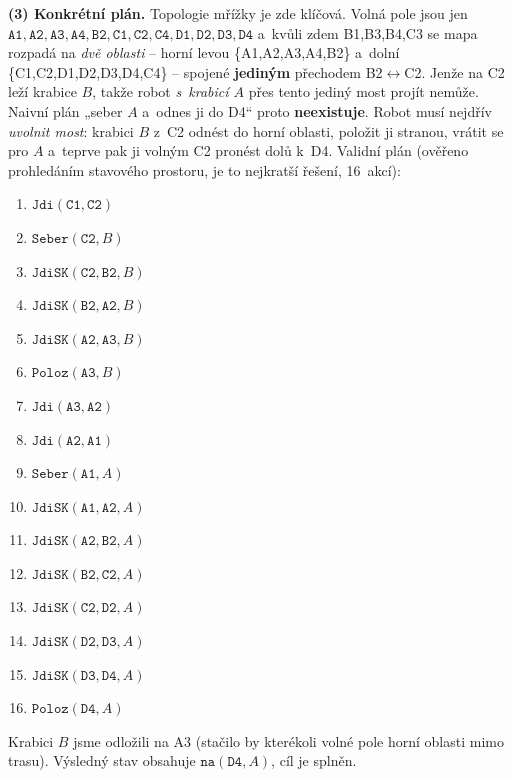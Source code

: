 \begin{priklad}
\medskip
\textbf{(3) Konkrétní plán.} Topologie mřížky je zde klíčová. Volná pole jsou jen $\mathtt{A1,A2,A3,A4,B2,C1,C2,C4,D1,D2,D3,D4}$ a~kvůli zdem B1,B3,B4,C3 se mapa rozpadá na \emph{dvě oblasti} -- horní levou \{A1,A2,A3,A4,B2\} a~dolní \{C1,C2,D1,D2,D3,D4,C4\} -- spojené \textbf{jediným} přechodem B2$\leftrightarrow$C2. Jenže na C2 leží krabice $B$, takže robot \emph{s~krabicí $A$} přes tento jediný most projít nemůže. Naivní plán „seber $A$ a~odnes ji do D4`` proto \textbf{neexistuje}. Robot musí nejdřív \emph{uvolnit most}: krabici $B$ z~C2 odnést do horní oblasti, položit ji stranou, vrátit se pro $A$ a~teprve pak ji volným C2 pronést dolů k~D4. Validní plán (ověřeno prohledáním stavového prostoru, je to nejkratší řešení, 16~akcí):
\begin{enumerate}[nosep]
  \item $\mathtt{Jdi}(\mathtt{C1},\mathtt{C2})$
  \item $\mathtt{Seber}(\mathtt{C2},B)$
  \item $\mathtt{JdiSK}(\mathtt{C2},\mathtt{B2},B)$
  \item $\mathtt{JdiSK}(\mathtt{B2},\mathtt{A2},B)$
  \item $\mathtt{JdiSK}(\mathtt{A2},\mathtt{A3},B)$
  \item $\mathtt{Poloz}(\mathtt{A3},B)$
  \item $\mathtt{Jdi}(\mathtt{A3},\mathtt{A2})$
  \item $\mathtt{Jdi}(\mathtt{A2},\mathtt{A1})$
  \item $\mathtt{Seber}(\mathtt{A1},A)$
  \item $\mathtt{JdiSK}(\mathtt{A1},\mathtt{A2},A)$
  \item $\mathtt{JdiSK}(\mathtt{A2},\mathtt{B2},A)$
  \item $\mathtt{JdiSK}(\mathtt{B2},\mathtt{C2},A)$
  \item $\mathtt{JdiSK}(\mathtt{C2},\mathtt{D2},A)$
  \item $\mathtt{JdiSK}(\mathtt{D2},\mathtt{D3},A)$
  \item $\mathtt{JdiSK}(\mathtt{D3},\mathtt{D4},A)$
  \item $\mathtt{Poloz}(\mathtt{D4},A)$
\end{enumerate}
Krabici $B$ jsme odložili na A3 (stačilo by kterékoli volné pole horní oblasti mimo trasu). Výsledný stav obsahuje $\mathtt{na}(\mathtt{D4},A)$, cíl je splněn.


\end{priklad}
